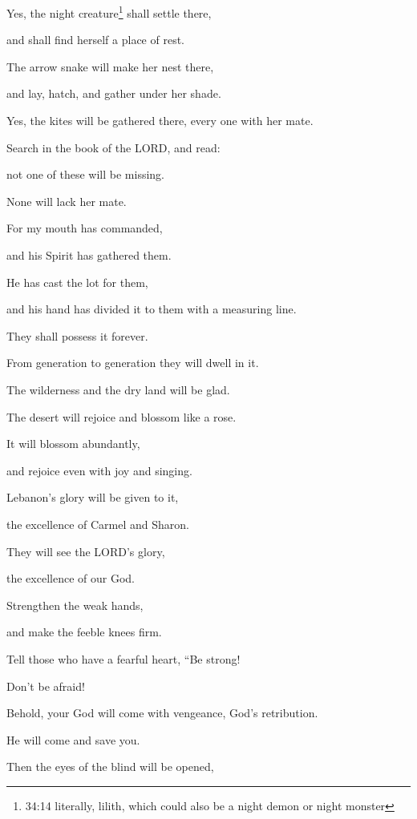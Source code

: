 Yes, the night creature\footnote{34:14 literally, lilith, which could also be a night demon or night monster} shall settle there,

and shall find herself a place of rest.

\myverse{}The arrow snake will make her nest there,

and lay, hatch, and gather under her shade.

Yes, the kites will be gathered there, every one with her mate.


\vspace{\baselineskip} \myverse{}Search in the book of the LORD, and read:

not one of these will be missing.

None will lack her mate.

For my mouth has commanded,

and his Spirit has gathered them.

\myverse{}He has cast the lot for them,

and his hand has divided it to them with a measuring line.

They shall possess it forever.

From generation to generation they will dwell in it.


\mychapter{} \myverse*{}The wilderness and the dry land will be glad.

\quad\quad The desert will rejoice and blossom like a rose.

\myverse{}It will blossom abundantly,

and rejoice even with joy and singing.

Lebanon’s glory will be given to it,

the excellence of Carmel and Sharon.

They will see the LORD’s glory,

the excellence of our God.


\vspace{\baselineskip} \myverse{}Strengthen the weak hands,

and make the feeble knees firm.

\myverse{}Tell those who have a fearful heart, “Be strong!

Don’t be afraid!

Behold, your God will come with vengeance, God’s retribution.

He will come and save you.


\vspace{\baselineskip} \myverse{}Then the eyes of the blind will be opened,


